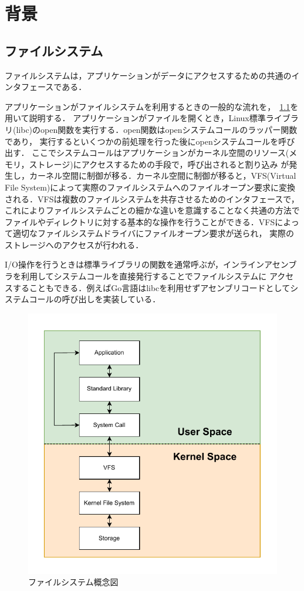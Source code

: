 \documentclass[a4paper,11pt]{jreport}
\begin{document}
\chapter{背景}

\section{ファイルシステム}
ファイルシステムは，アプリケーションがデータにアクセスするための共通のインタフェースである．

アプリケーションがファイルシステムを利用するときの一般的な流れを，\figurename~\ref{fig:Filesystem}を用いて説明する．
アプリケーションがファイルを開くとき，Linux標準ライブラリ(libc)のopen関数を実行する．open関数はopenシステムコールのラッパー関数であり，
実行するといくつかの前処理を行った後にopenシステムコールを呼び出す．
ここでシステムコールはアプリケーションがカーネル空間のリソース(メモリ，ストレージ)にアクセスするための手段で，呼び出されると割り込み
が発生し，カーネル空間に制御が移る．カーネル空間に制御が移ると，VFS(Virtual File System)によって実際のファイルシステムへのファイルオープン要求に変換される．VFSは複数のファイルシステムを共存させるためのインタフェースで，これによりファイルシステムごとの細かな違いを意識することなく共通の方法で
ファイルやディレクトリに対する基本的な操作を行うことができる．VFSによって適切なファイルシステムドライバにファイルオープン要求が送られ，
実際のストレージへのアクセスが行われる．

I/O操作を行うときは標準ライブラリの関数を通常呼ぶが，インラインアセンブラを利用してシステムコールを直接発行することでファイルシステムに
アクセスすることもできる．例えばGo言語はlibcを利用せずアセンブリコードとしてシステムコールの呼び出しを実装している．

\begin{figure}[h]
	\begin{minipage}[b]{1\columnwidth}
		\centering
		\includegraphics[width=0.9\linewidth]{./figure/filesystem_v2.pdf}
		\caption{ファイルシステム概念図}
		\label{fig:Filesystem}
	\end{minipage}
\end{figure}
\end{document}

